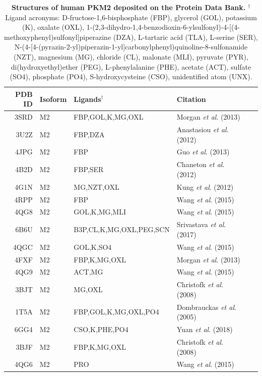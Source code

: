 \begin{table}[ht]
\begin{tabular}{rlllll}
  \hline
PDB ID & Isoform & Ligands$^{\dagger}$ & Citation \\ 
  \hline
3SRD & M2 & FBP,GOL,K,MG,OXL &  Morgan \textit{et al}. (2013) \cite{Morgan:2013aa} \\ 
3U2Z & M2 & FBP,DZA &  Anastasiou \textit{et al}. (2012) \cite{Anastasiou:2012aa} \\ 
4JPG & M2 & FBP &  Guo \textit{et al}. (2013) \cite{Guo:2013aa} \\ 
4B2D & M2 & FBP,SER &  Chaneton \textit{et al}. (2012) \cite{Chaneton:2012aa} \\ 
4G1N & M2 & MG,NZT,OXL &  Kung \textit{et al}. (2012) \cite{Kung:2012aa} \\ 
4RPP & M2 & FBP &  Wang \textit{et al}. (2015) \cite{Wang:2015aa} \\ 
4QG8 & M2 & GOL,K,MG,MLI &  Wang \textit{et al}. (2015) \cite{Wang:2015aa} \\ 
6B6U & M2 & B3P,CL,K,MG,OXL,PEG,SCN &  Srivastava \textit{et al}. (2017) \cite{Srivastava:2017aa} \\ 
4QGC & M2 & GOL,K,SO4 &  Wang \textit{et al}. (2015) \cite{Wang:2015aa} \\ 
4FXF & M2 &  FBP,K,MG,OXL &  Morgan \textit{et al}. (2013) \cite{Morgan:2013aa} \\ 
4QG9 & M2 &  ACT,MG &  Wang \textit{et al}. (2015) \cite{Wang:2015aa} \\ 
3BJT & M2 & MG,OXL &  Christofk \textit{et al}. (2008) \cite{Christofk:2008aa} \\ 
1T5A & M2 & FBP,GOL,K,MG,OXL,PO4 &  Dombrauckas \textit{et al}. (2005) \cite{Dombrauckas:2005aa} \\ 
6GG4 & M2 & CSO,K,PHE,PO4 &  Yuan \textit{et al}. (2018) \cite{Yuan:2018aa}\\ 
3BJF & M2 & FBP,K,MG,OXL &  Christofk \textit{et al}. (2008) \cite{Christofk:2008aa} \\ 
4QG6 & M2 & PRO &  Wang \textit{et al}. (2015) \cite{Wang:2015aa} \\ 
   \hline
\end{tabular}
\caption[Structures of human PKM2 deposited on the Protein Data Bank.]{\textbf{Structures of human PKM2 deposited on the Protein Data Bank.} $^{\dagger}$Ligand acronyms: D-fructose-1,6-bisphosphate (FBP), glycerol (GOL), potassium (K), oxalate (OXL), 1-(2,3-dihydro-1,4-benzodioxin-6-ylsulfonyl)-4-[(4-methoxyphenyl)sulfonyl]piperazine (DZA), L-tartaric acid (TLA), L-serine (SER), N-(4-{[4-(pyrazin-2-yl)piperazin-1-yl]carbonyl}phenyl)quinoline-8-sulfonamide (NZT), magnesium (MG),  chloride (CL), malonate (MLI), pyruvate (PYR), di(hydroxyethyl)ether (PEG), L-phenylalanine (PHE), acetate (ACT), sulfate (SO4), phosphate (PO4), S-hydroxycysteine (CSO), unidentified atom (UNX).}
\end{table}

